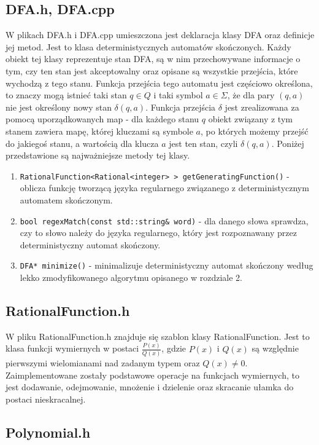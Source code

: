 \subsection{DFA.h, DFA.cpp}

W plikach DFA.h i DFA.cpp umieszczona jest deklaracja klasy DFA oraz definicje jej metod. Jest to klasa deterministycznych automatów skończonych. Każdy obiekt tej klasy reprezentuje stan DFA, są w nim przechowywane informacje o tym, czy ten stan jest akceptowalny oraz opisane są wszystkie przejścia, które wychodzą z tego stanu. Funkcja przejścia tego automatu jest częściowo określona, to znaczy mogą istnieć taki stan $q\in Q$ i taki symbol $a\in\Sigma$, że dla pary $(q,a)$ nie jest określony nowy stan $\delta(q,a)$. Funkcja przejścia $\delta$ jest zrealizowana za pomocą uporządkowanych map - dla każdego stanu $q$ obiekt związany z tym stanem zawiera mapę, której kluczami są symbole $a$, po których możemy przejść do jakiegoś stanu, a wartością dla klucza 
$a$ jest ten stan, czyli $\delta(q,a)$. Poniżej przedstawione są najważniejsze metody tej klasy.
\begin{enumerate}
    \item \texttt{RationalFunction<Rational<integer> > getGeneratingFunction()} - oblicza funkcję tworzącą języka regularnego związanego z deterministycznym automatem skończonym.
    \item \texttt{bool regexMatch(const std::string& word)} - dla danego słowa sprawdza, czy to słowo należy do języka regularnego, który jest rozpoznawany przez deterministyczny automat skończony.
    \item \texttt{DFA* minimize()} - minimalizuje deterministyczny automat skończony według lekko zmodyfikowanego algorytmu opisanego w rozdziale 2.
\end{enumerate}

\subsection{RationalFunction.h}

W pliku RationalFunction.h znajduje się szablon klasy RationalFunction. Jest to klasa funkcji wymiernych w postaci $\frac{P(x)}{Q(x)}$, gdzie $P(x)$ i $Q(x)$ są względnie pierwszymi wielomianami nad zadanym typem oraz $Q(x)\neq 0$. Zaimplementowane zostały podstawowe operacje na funkcjach wymiernych, to jest dodawanie, odejmowanie, mnożenie i dzielenie oraz skracanie ułamka do postaci nieskracalnej.

\subsection{Polynomial.h}


